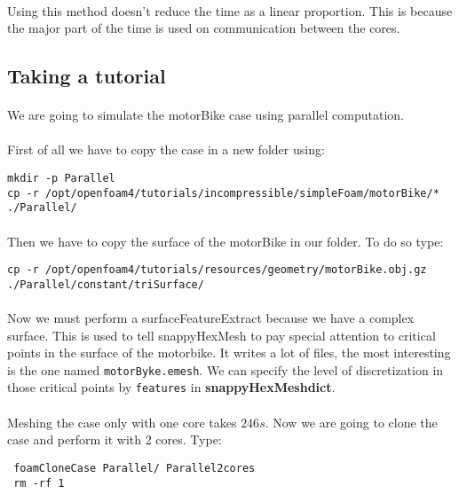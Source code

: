 \paragraph{}Using this method doesn't reduce the time as a linear proportion. This is because the major part of the time is used on communication between the cores.


\subsection{Taking a tutorial}
\paragraph{}We are going to simulate the motorBike case using parallel computation.
\paragraph{}First of all we have to copy the case in a new folder using:
\begin{lstlisting}
mkdir -p Parallel
cp -r /opt/openfoam4/tutorials/incompressible/simpleFoam/motorBike/* ./Parallel/

\end{lstlisting}
\paragraph{}Then we have to copy the surface of the motorBike in our folder. To do so type:
\begin{lstlisting}
cp -r /opt/openfoam4/tutorials/resources/geometry/motorBike.obj.gz  ./Parallel/constant/triSurface/
\end{lstlisting}
\paragraph{}Now we must perform a surfaceFeatureExtract because we have a complex surface. This is used to tell snappyHexMesh to pay special attention to critical points in the surface of the motorbike. It writes a lot of files, the most interesting is the one named \lstinline!motorByke.emesh!. We can specify the level of discretization in those critical points by \texttt{features} in \textbf{snappyHexMeshdict}.

\paragraph{}Meshing the case only with one core takes $246 s$. Now we are going to clone the case and perform it with 2 cores. Type:
\begin{lstlisting}
 foamCloneCase Parallel/ Parallel2cores
 rm -rf 1
\end{lstlisting}

